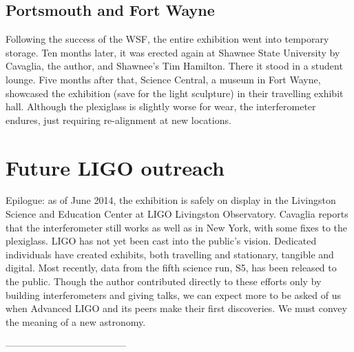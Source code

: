         \subsection{Portsmouth and Fort Wayne}
        \label{secondary_installations}


Following the success of the WSF, the entire exhibition went into temporary storage.
Ten months later, it was erected again at Shawnee State University by Cavaglia, the author, and Shawnee's Tim Hamilton.
There it stood in a student lounge.
Five months after that, Science Central, a museum in Fort Wayne, showcased the exhibition (save for the light sculpture) in their travelling exhibit hall.
Although the plexiglass is slightly worse for wear, the interferometer endures, just requiring re-alignment at new locations.


    \section{Future LIGO outreach}
    \label{future_outreach}

        Epilogue: as of June 2014, the exhibition is safely on display in the Livingston Science and Education Center at LIGO Livingston Observatory.
Cavaglia reports that the interferometer still works as well as in New York, with some fixes to the plexiglass.
LIGO has not yet been cast into the public's vision.
Dedicated individuals have created exhibits, both travelling and stationary, tangible and digital.
Most recently, data from the fifth science run, S5, has been released to the public.
Though the author contributed directly to these efforts only by building interferometers and giving talks, we can expect more to be asked of us when Advanced LIGO and its peers make their first discoveries.
We must convey the meaning of a new astronomy.



        --------------------------------------





